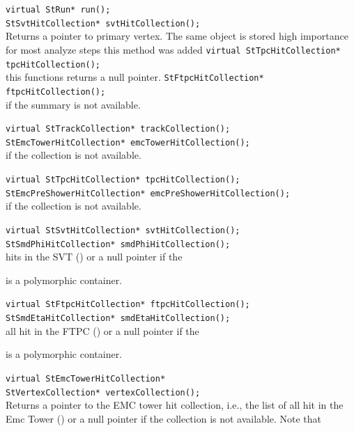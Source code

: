 \begin{enumerate}
\begin{Entry}

    \verb+virtual StRun* run();+\\
    \verb+StSvtHitCollection* svtHitCollection();+\\

    
    Returns a pointer to primary vertex. The same object is stored
    high importance for most analyze steps this method was added
    \verb+virtual StTpcHitCollection* tpcHitCollection();+\\  
    this functions returns a null pointer.
    \verb+StFtpcHitCollection* ftpcHitCollection();+\\

    

    if the summary is not available.

    \verb+virtual StTrackCollection* trackCollection();+\\
    \verb+StEmcTowerHitCollection* emcTowerHitCollection();+\\
    if the collection is not available.
    

    \verb+virtual StTpcHitCollection* tpcHitCollection();+\\ 
    \verb+StEmcPreShowerHitCollection* emcPreShowerHitCollection();+\\
    if the collection is not available.
    

    \verb+virtual StSvtHitCollection* svtHitCollection();+\\
    \verb+StSmdPhiHitCollection* smdPhiHitCollection();+\\
    hits in the SVT () or a null pointer if the
    
    is a polymorphic container.


    \verb+virtual StFtpcHitCollection* ftpcHitCollection();+\\
    \verb+StSmdEtaHitCollection* smdEtaHitCollection();+\\
    all hit in the FTPC () or a null pointer if the
    
    is a polymorphic container.


    \verb+virtual StEmcTowerHitCollection*+\\
    \verb+StVertexCollection* vertexCollection();+\\
    Returns a pointer to the EMC tower hit collection, i.e., the list
    of all hit in the Emc Tower () or a null
    pointer if the collection is not available.  Note that


\end{Entry}
\end{enumerate}
